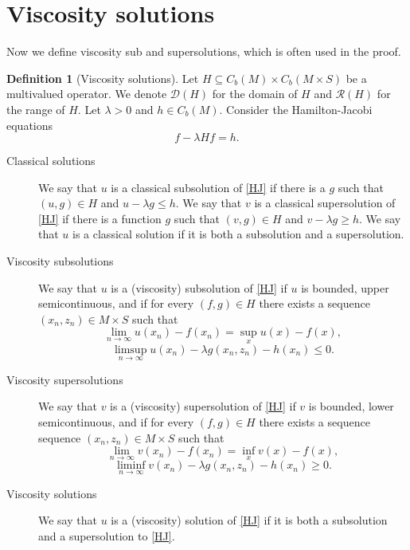 \documentclass[a4paper]{article}
\numberwithin{equation}{section}
\theoremstyle{definition}
\newtheorem{definition}[theorem]{Definition}
\begin{document}
\section{Viscosity solutions}
Now we define viscosity sub and supersolutions, which is often used in the proof.
\begin{definition}[Viscosity solutions] \label{def_VS}Let $H\subseteq C_b(M)\times C_b(M\times S)$ be a multivalued operator. We denote $\mathcal{D}(H)$ for the domain of $H$ and $\mathcal{R}(H)$ for the range of $H$. Let $\lambda>0$ and $h\in C_b(M)$. Consider the Hamilton-Jacobi equations
	\begin{equation}\label{HJ}
		f-\lambda H f=h.
	\end{equation}
	\begin{description}
		\item [Classical solutions] 
		We say that $u$ is a classical subsolution of \eqref{HJ} if there is a $g$ such that $(u,g)\in H$ and $u - \lambda g \leq h$. We say that $v$ is a classical supersolution of \eqref{HJ} if there is a function $g$ such that $(v, g) \in H$ and $v - \lambda g \geq h$. We say that $u$ is a classical solution if it is both a subsolution and a supersolution.
		\item[Viscosity subsolutions] We say that $u$ is a (viscosity) subsolution of \eqref{HJ} if $u$ is bounded, upper semicontinuous, and if for every $(f,g)\in H$ there exists a sequence $(x_n,z_n) \in M\times S$ such that
		\begin{equation*}
			\lim_{n\to\infty}u(x_n)-f(x_n)=\sup_{x}u(x)-f(x),
		\end{equation*}
		\begin{equation*}
			\limsup_{n\to\infty}u(x_n)-\lambda g(x_n,z_n)-h(x_n)\leq 0.
		\end{equation*}
		\item[Viscosity supersolutions] We say that $v$ is a (viscosity) supersolution of \eqref{HJ} 
		if $v$ is bounded, lower semicontinuous, and if for every $(f,g)\in H$ there exists a sequence sequence $(x_n,z_n) \in M\times S$ such that
		\begin{equation*}
			\lim_{n\to\infty}v(x_n)-f(x_n)=\inf_{x}v(x)-f(x),
		\end{equation*}
		\begin{equation*}
			\liminf_{n\to\infty}v(x_n)-\lambda g(x_n,z_n)-h(x_n)\geq 0.
		\end{equation*}
		\item [Viscosity solutions] We say that $u$ is a (viscosity) solution of \eqref{HJ} if it is both a subsolution and a supersolution to \eqref{HJ}. 
	\end{description}
\end{definition}
\end{document}
